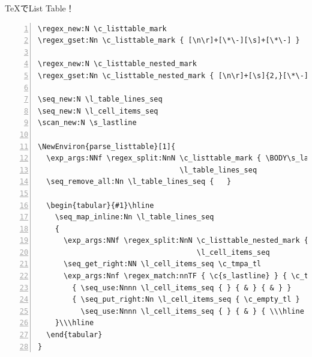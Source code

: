 \documentclass[14pt,dvipdfmx,uplatex]{beamer}
\begin{document}
\begin{frame}[t,fragile=singleslide]{\inhibitglue \TeX{}でList Table！}
\fontsize{7pt}{6.5pt}\selectfont
\begin{tcolorbox}[left=1pt]
\begin{Verbatim}[numbers=left, highlightlines={2, 5, 12-13, 19-20, 22}]
\regex_new:N \c_listtable_mark
\regex_gset:Nn \c_listtable_mark { [\n\r]+[\*\-][\s]+[\*\-] }

\regex_new:N \c_listtable_nested_mark
\regex_gset:Nn \c_listtable_nested_mark { [\n\r]+[\s]{2,}[\*\-] }

\seq_new:N \l_table_lines_seq
\seq_new:N \l_cell_items_seq
\scan_new:N \s_lastline

\NewEnviron{parse_listtable}[1]{
  \exp_args:NNf \regex_split:NnN \c_listtable_mark { \BODY\s_lastline }
                                 \l_table_lines_seq
  \seq_remove_all:Nn \l_table_lines_seq {   }
  
  \begin{tabular}{#1}\hline
    \seq_map_inline:Nn \l_table_lines_seq
    {
      \exp_args:NNf \regex_split:NnN \c_listtable_nested_mark { ##1 }
                                     \l_cell_items_seq
      \seq_get_right:NN \l_cell_items_seq \c_tmpa_tl
      \exp_args:Nnf \regex_match:nnTF { \c{s_lastline} } { \c_tmpa_tl }
        { \seq_use:Nnnn \l_cell_items_seq { } { & } { & } }
        { \seq_put_right:Nn \l_cell_items_seq { \c_empty_tl }
          \seq_use:Nnnn \l_cell_items_seq { } { & } { \\\hline } }
    }\\\hline
  \end{tabular}
}
\end{Verbatim}
\end{tcolorbox}
\end{frame}
\end{document}
